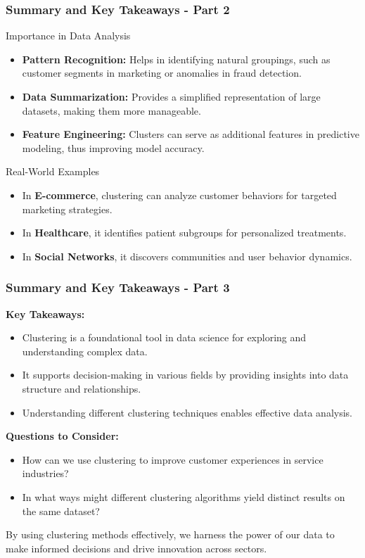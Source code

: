 \documentclass[aspectratio=169]{beamer}
\begin{document}
\begin{frame}[fragile]
  \frametitle{Summary and Key Takeaways - Part 2}
  
  \begin{block}{Importance in Data Analysis}
      \begin{itemize}
          \item \textbf{Pattern Recognition:} Helps in identifying natural groupings, such as customer segments in marketing or anomalies in fraud detection.
          \item \textbf{Data Summarization:} Provides a simplified representation of large datasets, making them more manageable.
          \item \textbf{Feature Engineering:} Clusters can serve as additional features in predictive modeling, thus improving model accuracy.
      \end{itemize}
  \end{block}

  \begin{block}{Real-World Examples}
      \begin{itemize}
          \item In \textbf{E-commerce}, clustering can analyze customer behaviors for targeted marketing strategies.
          \item In \textbf{Healthcare}, it identifies patient subgroups for personalized treatments.
          \item In \textbf{Social Networks}, it discovers communities and user behavior dynamics.
      \end{itemize}
  \end{block}
\end{frame}

\begin{frame}[fragile]
  \frametitle{Summary and Key Takeaways - Part 3}

  \textbf{Key Takeaways:}
  \begin{itemize}
      \item Clustering is a foundational tool in data science for exploring and understanding complex data.
      \item It supports decision-making in various fields by providing insights into data structure and relationships.
      \item Understanding different clustering techniques enables effective data analysis.
  \end{itemize}

  \textbf{Questions to Consider:}
  \begin{itemize}
      \item How can we use clustering to improve customer experiences in service industries?
      \item In what ways might different clustering algorithms yield distinct results on the same dataset? 
  \end{itemize}

  By using clustering methods effectively, we harness the power of our data to make informed decisions and drive innovation across sectors.
\end{frame}
\end{document}
